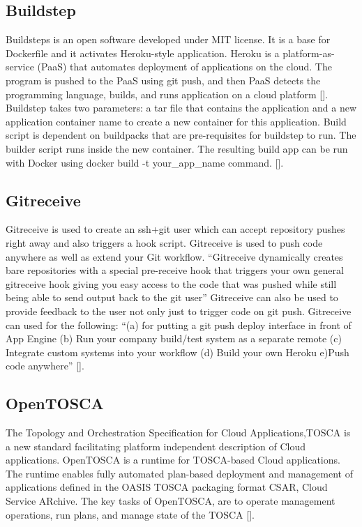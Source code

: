      
\subsection{Buildstep}
     
Buildsteps is an open software developed under MIT license.  It is a
base for Dockerfile and it activates Heroku-style application. Heroku
is a platform-as-service (PaaS) that automates deployment of
applications on the cloud. The program is pushed to the PaaS using git
push, and then PaaS detects the programming language, builds, and runs
application on a cloud platform [\cite{plassnig15}].  Buildstep takes
two parameters: a tar file that contains the application and a new
application container name to create a new container for this
application. Build script is dependent on buildpacks that are
pre-requisites for buildstep to run. The builder script runs inside
the new container.  The resulting build app can be run with Docker
using docker build -t your\_app\_name
command. [\cite{github-buildstep}].

\subsection{Gitreceive}

Gitreceive is used to create an ssh+git user which can accept
repository pushes right away and also triggers a hook
script. Gitreceive is used to push code anywhere as well as extend
your Git workflow. ``Gitreceive dynamically creates bare repositories
with a special pre-receive hook that triggers your own general
gitreceive hook giving you easy access to the code that was pushed
while still being able to send output back to the git user''
Gitreceive can also be used to provide feedback to the user not only
just to trigger code on git push.  Gitreceive can used for the
following: ``(a) for putting a git push deploy interface in front of
App Engine (b) Run your company build/test system as a separate remote
(c) Integrate custom systems into your workflow (d) Build your own
Heroku e)Push code anywhere'' [\cite{lindsay2016}].
     
\subsection{OpenTOSCA}

The Topology and Orchestration Specification for Cloud
Applications,TOSCA is a new standard facilitating platform independent
description of Cloud applications. OpenTOSCA is a runtime for
TOSCA-based Cloud applications. The runtime enables fully automated
plan-based deployment and management of applications defined in the
OASIS TOSCA packaging format CSAR, Cloud Service ARchive.  The key
tasks of OpenTOSCA, are to operate management operations, run plans,
and manage state of the TOSCA [\cite{openTOSCA-paper}].
     

